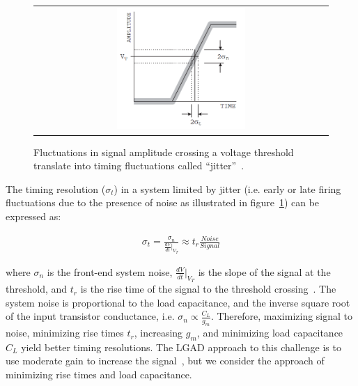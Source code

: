 \begin{refsection}
\begin{figure}[htb]
  \begin{center}
    \begin{tabular}{c}
        \includegraphics[width=0.45\textwidth]{fig_FastTiming/Jitter.png}
    \end{tabular}
    \caption{Fluctuations in signal amplitude crossing a voltage threshold translate into timing fluctuations called ``jitter''~\cite{Spieler:369858}.
            }            
    \label{Jitter}
  \end{center}
\end{figure}
The timing resolution ($\sigma_t$) in a system limited by jitter (i.e. early or late firing fluctuations due to the presence of noise as illustrated in figure~\ref{Jitter}) can be expressed as:
\begin{linenomath*}
\begin{align}
\sigma_t =\frac{\sigma_n}{\frac{d V}{d t}\vert_{V_T}} \approx t_r\frac{Noise}{Signal}
\end{align}
\end{linenomath*}
where $\sigma_n$ is the front-end system noise, $\frac{d V}{d t}\vert_{V_T}$ is the slope of the signal at the threshold, and $t_r$ is the rise time of the signal to the threshold crossing~\cite{4336333}.
The system noise is proportional to the load capacitance, and the inverse square root of the input transistor conductance, i.e. $\sigma_n \propto \frac{C_L}{g_m}$.
Therefore, maximizing signal to noise, minimizing rise times $t_r$, increasing $g_m$, and minimizing load capacitance $C_L$ yield better timing resolutions.
The LGAD approach to this challenge is to use moderate gain to increase the signal~\cite{SADROZINSKI2013226}, but we consider the approach of minimizing rise times and load capacitance.


\end{refsection}
